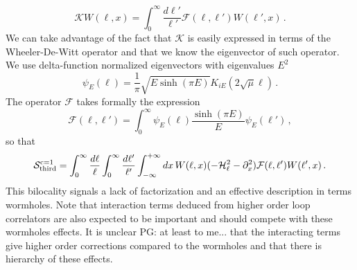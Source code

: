 \documentclass[a4paper]{article}
\newcommand{\purple}[1]{{\color{purple} #1 \color{black}}}
\newcommand{\PG}[1]{{\purple{PG: #1}}} %
\begin{document}
\begin{equation}
  \mathcal{K}W(\ell,x) = \int_{0}^{\infty}\frac{d\ell'}{\ell'} \mathcal{F}(\ell,\ell')W(\ell',x)\,.
\end{equation}
We can take advantage of the fact that $\mathcal{K}$ is easily expressed in terms of the Wheeler-De-Witt operator and that we know the eigenvector of such operator. We use delta-function normalized eigenvectors with eigenvalues $E^2$
\begin{equation}
  \psi_E(\ell)=\frac{1}{\pi}\sqrt{E\sinh(\pi E)}K_{iE}(2\sqrt{\mu}\ell)\,.
\end{equation}
The operator $\mathcal{F}$ takes formally the expression
\begin{equation}
  \mathcal{F}(\ell,\ell') =\int_{0}^{\infty}\psi_E(\ell) \frac{\sinh(\pi E)}{E}\psi_E(\ell')\,, 
\end{equation}
so that
\begin{equation}
  \mathcal{S}^{\rm c=1}_{\rm third} = \int_0^{\infty}\frac{d\ell}{\ell} \int_0^{\infty}\frac{d\ell'}{\ell'} \int_{-\infty}^{+\infty} dx \,W(\ell,x)(-\mathcal{H}_\ell^2-\partial_x^2) \mathcal{F}(\ell,\ell') W(\ell',x)\,.
\end{equation}
This bilocality signals a lack of factorization and an effective description in terms wormholes. Note that interaction terms deduced from higher order loop correlators are also expected to be important and should compete with these wormholes effects. It is unclear \PG{at least to me...} that the interacting terms give higher order corrections compared to the wormholes and that there is hierarchy of these effects.
\end{document}
